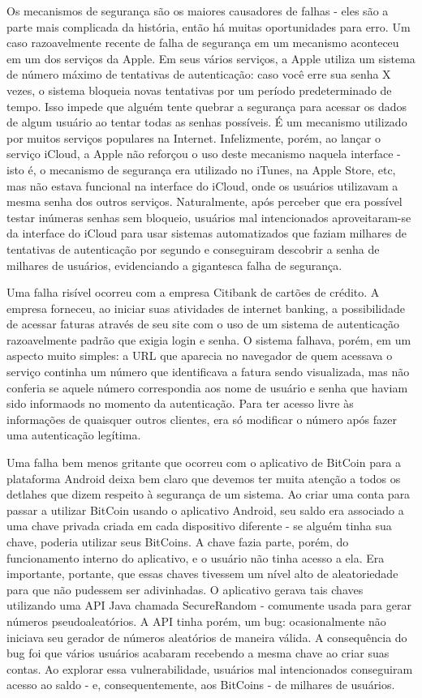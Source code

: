 \documentclass[
	10pt,				%
	openright,			%
	twoside,			%
	a5paper,			%
	english,			%
	french,				%
	spanish,			%
	brazil,				%
	sumario=tradicional
]{abntex2}
\begin{document}
Os mecanismos de segurança são os maiores causadores de falhas - eles são a parte mais complicada da história, então há muitas oportunidades para erro. Um caso razoavelmente recente de falha de segurança em um mecanismo aconteceu em um dos serviços da Apple. Em seus vários serviços, a Apple utiliza um sistema de número máximo de tentativas de autenticação: caso você erre sua senha X vezes, o sistema bloqueia novas tentativas por um período predeterminado de tempo. Isso impede que alguém tente quebrar a segurança para acessar os dados de algum usuário ao tentar todas as senhas possíveis. É um mecanismo utilizado por muitos serviços populares na Internet. Infelizmente, porém, ao lançar o serviço iCloud, a Apple não reforçou o uso deste mecanismo naquela interface - isto é, o mecanismo de segurança era utilizado no iTunes, na Apple Store, etc, mas não estava funcional na interface do iCloud, onde os usuários utilizavam a mesma senha dos outros serviços. Naturalmente, após perceber que era possível testar inúmeras senhas sem bloqueio, usuários mal intencionados aproveitaram-se da interface do iCloud para usar sistemas automatizados que faziam milhares de tentativas de autenticação por segundo e conseguiram descobrir a senha de milhares de usuários, evidenciando a gigantesca falha de segurança. 

Uma falha risível ocorreu com a empresa Citibank de cartões de crédito. A empresa forneceu, ao iniciar suas atividades de internet banking, a possibilidade de acessar faturas através de seu site com o uso de um sistema de autenticação razoavelmente padrão que exigia login e senha. O sistema falhava, porém, em um aspecto muito simples: a URL que aparecia no navegador de quem acessava o serviço continha um número que identificava a fatura sendo visualizada, mas não conferia se aquele número correspondia aos nome de usuário e senha que haviam sido informaods no momento da autenticação. Para ter acesso livre às informações de quaisquer outros clientes, era só modificar o número após fazer uma autenticação legítima. 

Uma falha bem menos gritante que ocorreu com o aplicativo de BitCoin para a plataforma Android deixa bem claro que devemos ter muita atenção a todos os detlahes que dizem respeito à segurança de um sistema. Ao criar uma conta para passar a utilizar BitCoin usando o aplicativo Android, seu saldo era associado a uma chave privada criada em cada dispositivo diferente - se alguém tinha sua chave, poderia utilizar seus BitCoins. A chave fazia parte, porém, do funcionamento interno do aplicativo, e o usuário não tinha acesso a ela. Era importante, portante, que essas chaves tivessem um nível alto de aleatoriedade para que não pudessem ser adivinhadas. O aplicativo gerava tais chaves utilizando uma API Java chamada SecureRandom - comumente usada para gerar números pseudoaleatórios. A API tinha porém, um bug: ocasionalmente não iniciava seu gerador de números aleatórios de maneira válida. A consequência do bug foi que vários usuários acabaram recebendo a mesma chave ao criar suas contas. Ao explorar essa vulnerabilidade, usuários mal intencionados conseguiram acesso ao saldo - e, consequentemente, aos BitCoins - de milhares de usuários.
\end{document}
